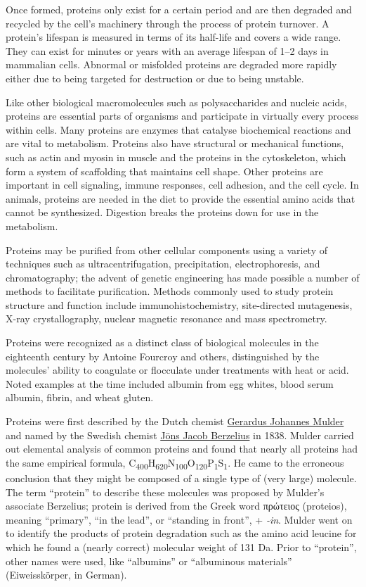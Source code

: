 Once formed, proteins only exist for a certain period and are then degraded and recycled by the cell's machinery through the process of protein turnover. A protein's lifespan is measured in terms of its half-life and covers a wide range. They can exist for minutes or years with an average lifespan of 1--2 days in mammalian cells. Abnormal or misfolded proteins are degraded more rapidly either due to being targeted for destruction or due to being unstable.

Like other biological macromolecules such as polysaccharides and nucleic acids, proteins are essential parts of organisms and participate in virtually every process within cells. Many proteins are enzymes that catalyse biochemical reactions and are vital to metabolism. Proteins also have structural or mechanical functions, such as actin and myosin in muscle and the proteins in the cytoskeleton, which form a system of scaffolding that maintains cell shape. Other proteins are important in cell signaling, immune responses, cell adhesion, and the cell cycle. In animals, proteins are needed in the diet to provide the essential amino acids that cannot be synthesized. Digestion breaks the proteins down for use in the metabolism.

Proteins may be purified from other cellular components using a variety of techniques such as ultracentrifugation, precipitation, electrophoresis, and chromatography; the advent of genetic engineering has made possible a number of methods to facilitate purification. Methods commonly used to study protein structure and function include immunohistochemistry, site-directed mutagenesis, X-ray crystallography, nuclear magnetic resonance and mass spectrometry.

Proteins were recognized as a distinct class of biological molecules in the eighteenth century by Antoine Fourcroy and others, distinguished by the molecules' ability to coagulate or flocculate under treatments with heat or acid. Noted examples at the time included albumin from egg whites, blood serum albumin, fibrin, and wheat gluten.

Proteins were first described by the Dutch chemist \href{https://en.wikipedia.org/wiki/Gerardus_Johannes_Mulder}{Gerardus Johannes Mulder} and named by the Swedish chemist \href{https://en.wikipedia.org/wiki/Jöns_Jacob_Berzelius}{Jöns Jacob Berzelius} in 1838. Mulder carried out elemental analysis of common proteins and found that nearly all proteins had the same empirical formula, C\textsubscript{400}H\textsubscript{620}N\textsubscript{100}O\textsubscript{120}P\textsubscript{1}S\textsubscript{1}. He came to the erroneous conclusion that they might be composed of a single type of (very large) molecule. The term ``protein'' to describe these molecules was proposed by Mulder's associate Berzelius; protein is derived from the Greek word πρώτειος (proteios), meaning ``primary'', ``in the lead'', or ``standing in front'', + \emph{-in}. Mulder went on to identify the products of protein degradation such as the amino acid leucine for which he found a (nearly correct) molecular weight of 131 Da. Prior to ``protein'', other names were used, like ``albumins'' or ``albuminous materials'' (Eiweisskörper, in German).

